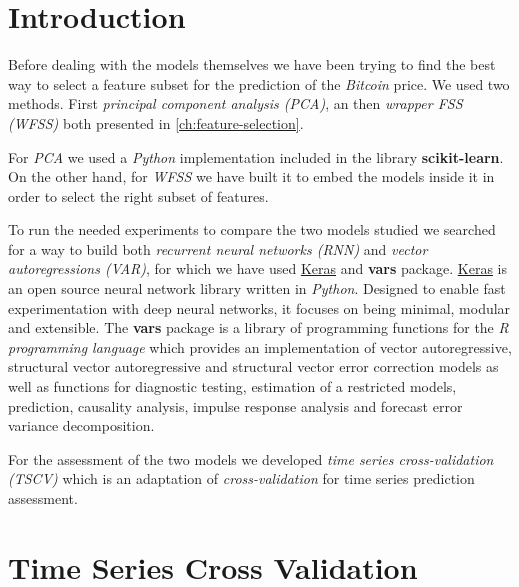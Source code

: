 
\chapter{Introduction}
\label{ch:impl_introduction}


Before dealing with the models themselves we have been trying to find
the best way to select a feature subset for the prediction of the
\textit{Bitcoin} price. We used two methods. First \textit{principal
component analysis (PCA)}, an then \textit{wrapper FSS (WFSS)} both
presented in \autoref{ch:feature-selection}.

For \textit{PCA} we used a \textit{Python} implementation included in
the library \textbf{scikit-learn}. On the other hand, for
\textit{WFSS} we have built it to embed the models inside it in order
to select the right subset of features.

To run the needed experiments to compare the two models studied we
searched for a way to build both \textit{recurrent neural networks
(RNN)} and \textit{vector autoregressions (VAR)}, for which we have
used \href{http://www.keras.io}{Keras} and \textbf{vars} package.
\href{http://www.keras.io}{Keras} is an open source neural network
library written in \textit{Python}. Designed to enable fast
experimentation with deep neural networks, it focuses on being
minimal, modular and extensible. The \textbf{vars} package is a
library of programming functions for the \textit{R programming
language} which provides an implementation of vector autoregressive,
structural vector autoregressive and structural vector error
correction models as well as functions for diagnostic testing,
estimation of a restricted models, prediction, causality analysis,
impulse response analysis and forecast error variance decomposition.

For the assessment of the two models we developed \textit{time series
cross-validation (TSCV)} which is an adaptation of
\textit{cross-validation} for time series prediction assessment.

\chapter{Time Series Cross Validation}
\label{ch:tscv}

